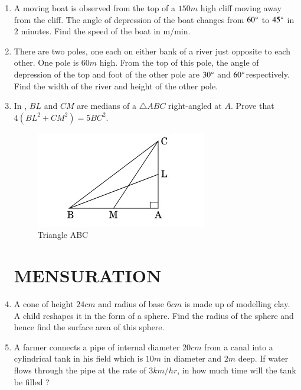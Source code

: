 \documentclass[2pt,-letter paper]{article}
\begin{document}
\begin{enumerate}
\item A moving boat is observed from the top of a $150m$ high cliff moving away from the cliff. The angle of depression of the boat changes from $60\degree$ to $45\degree$ in $2$ minutes. Find the speed of the boat in m/min.

\item There are two poles, one each on either bank of a river just opposite to each other. One pole is $60m$ high. From the top of this pole, the angle of depression of the top and foot of the other pole are $30\degree$ and $60\degree$respectively. Find the width of the river and height of the other pole.

\item In , $BL$ and $CM$ are medians of a $\triangle ABC$ right-angled at $A$. Prove that $4(BL^2 + CM^2)= 5 BC^2$. 
\begin{figure}[H]
    \centering
    \includegraphics[width=\columnwidth]{figs/img1.jpg}
    \caption{Triangle ABC}
    \label{fig: Fig_3}
\end{figure}

\section{MENSURATION}
\item A cone of height $24 cm$ and radius of base $6 cm$ is made up of modelling clay. A child reshapes it in the form of a sphere. Find the radius of the sphere and hence find the surface area of this sphere.
\item A farmer connects a pipe of internal diameter $20 cm$ from a canal into a cylindrical tank in his field which is $10 m$ in diameter and $2 m$ deep. If water flows through the pipe at the rate of $3 km/hr$, in how much time will the tank be filled ?


\end{enumerate}
\end{document}
